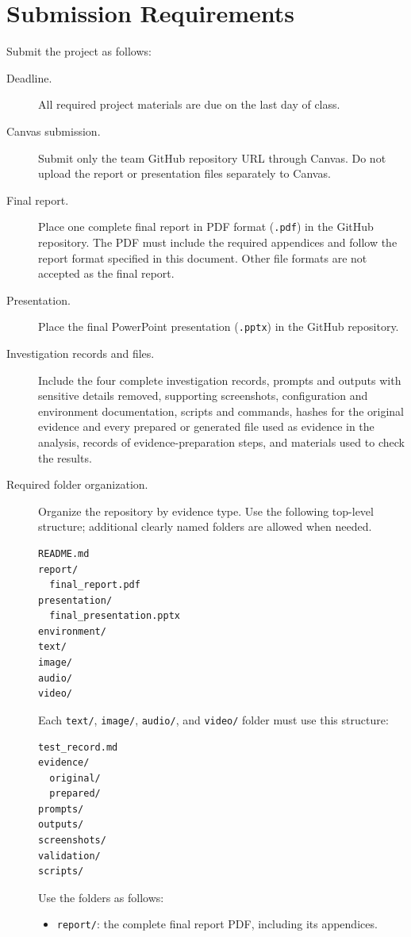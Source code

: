 \documentclass[12pt,letterpaper]{article}
\begin{document}
\section{Submission Requirements}
Submit the project as follows:

\begin{description}
    \item[Deadline.] All required project materials are due on the last day of class.
    \item[Canvas submission.] Submit only the team GitHub repository URL through Canvas. Do not upload the report or presentation files separately to Canvas.
    \item[Final report.] Place one complete final report in PDF format (\texttt{.pdf}) in the GitHub repository. The PDF must include the required appendices and follow the report format specified in this document. Other file formats are not accepted as the final report.
    \item[Presentation.] Place the final PowerPoint presentation (\texttt{.pptx}) in the GitHub repository.
    \item[Investigation records and files.] Include the four complete investigation records, prompts and outputs with sensitive details removed, supporting screenshots, configuration and environment documentation, scripts and commands, hashes for the original evidence and every prepared or generated file used as evidence in the analysis, records of evidence-preparation steps, and materials used to check the results.
    \item[Required folder organization.] Organize the repository by evidence type. Use the following top-level structure; additional clearly named folders are allowed when needed.
          \begin{verbatim}
README.md
report/
  final_report.pdf
presentation/
  final_presentation.pptx
environment/
text/
image/
audio/
video/
\end{verbatim}
          Each \texttt{text/}, \texttt{image/}, \texttt{audio/}, and \texttt{video/} folder must use this structure:
          \begin{verbatim}
test_record.md
evidence/
  original/
  prepared/
prompts/
outputs/
screenshots/
validation/
scripts/
\end{verbatim}
          Use the folders as follows:
          \begin{itemize}
              \item \texttt{report/}: the complete final report PDF, including its appendices.

\end{itemize}
\end{description}
\end{document}
